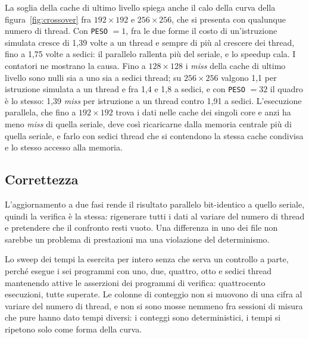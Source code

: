 La soglia della cache di ultimo livello spiega anche il calo della curva della
figura~\ref{fig:crossover} fra
$192\times192$ e $256\times256$, che si presenta con qualunque numero di thread. Con
\texttt{PESO} $=1$, fra le due forme il costo di un'istruzione simulata cresce
di 1,39 volte a un thread e sempre di più al crescere dei thread, fino a 1,75
volte a sedici: il parallelo rallenta più del seriale, e lo speedup cala. I
contatori ne mostrano la causa. Fino a $128\times128$ i \emph{miss} della cache di ultimo livello sono nulli sia a uno sia a sedici thread; su $256\times256$
valgono 1,1 per istruzione simulata a un thread e fra 1,4 e 1,8 a sedici, e con
\texttt{PESO} $=32$ il quadro è lo stesso: 1,39 \emph{miss} per istruzione a un
thread contro 1,91 a sedici. L'esecuzione
parallela, che fino a $192\times192$ trova i dati nelle cache dei singoli core e
anzi ha meno \emph{miss} di quella seriale, deve così ricaricarne dalla memoria
centrale più di quella seriale, e farlo con sedici thread che si contendono la
stessa cache condivisa e lo stesso accesso alla memoria.

\subsection{Correttezza}

L'aggiornamento a due fasi rende il
risultato parallelo bit-identico a quello seriale, quindi la verifica è la
stessa: rigenerare tutti i dati al variare del numero di thread e pretendere che
il confronto resti vuoto. Una differenza in uno dei file non sarebbe un problema
di prestazioni ma una violazione del determinismo.

Lo sweep dei tempi la esercita per intero senza che serva un controllo a parte,
perché esegue i sei programmi con uno, due, quattro, otto e sedici thread
mantenendo attive le asserzioni dei programmi di verifica: quattrocento
esecuzioni, tutte superate. Le colonne di conteggio non si muovono di una cifra
al variare del numero di thread, e non si sono mosse nemmeno fra sessioni di
misura che pure hanno dato tempi diversi: i conteggi sono deterministici, i
tempi si ripetono solo come forma della curva.
